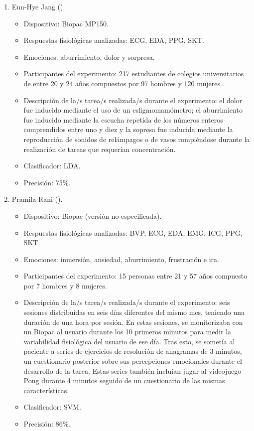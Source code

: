 \begin{enumerate}
    \item Eun-Hye Jang (\citeyear{jang2013classification}).
    \begin{itemize}
        \item Dispositivo: Biopac MP150.
        \item Respuestas fisiológicas analizadas: ECG, EDA, PPG, SKT.
        \item Emociones: aburrimiento, dolor y sorpresa.
        \item Participantes del experimento: 217 estudiantes de colegios universitarios de entre 20 y 24 años compuestos por 97 hombres y 120 mujeres.
        \item Descripción de la/s tarea/s realizada/s durante el experimento: el dolor fue inducido mediante el uso de un esfigmomamómetro; el aburrimiento fue inducido mediante la escucha repetida de los números enteros comprendidos entre uno y diez y la sopresa fue inducida mediante la reproducción de sonidos de relámpagos o de vasos rompiéndose durante la realización de tareas que requerían concentración.
        \item Clasificador: \ac{LDA}.
        \item Precisión: 75\%.
    \end{itemize}

    \item Pramila Rani (\citeyear{rani2006empirical}).
    \begin{itemize}
        \item Dispositivo: Biopac (versión no especificada).
        \item Respuestas fisiológicas analizadas: BVP, ECG, EDA, EMG, ICG, PPG, SKT.
        \item Emociones: inmersión, ansiedad, aburrimiento, frustración e ira.
        \item Participantes del experimento: 15 personas entre 21 y 57 años compuesto por 7 hombres y 8 mujeres.
        \item Descripción de la/s tarea/s realizada/s durante el experimento: seis sesiones distribuidas en seis días diferentes del mismo mes, teniendo una duración de una hora por sesión. En estas sesiones, se monitorizaba con un Biopac al usuario durante los 10 primeros minutos para medir la variabilidad fisiológica del usuario de ese día. Tras esto, se sometía al paciente a series de ejercicios de resolución de anagramas de 3 minutos, un cuestionario posterior sobre sus percepciones emocionales durante el desarrollo de la tarea. Estas series también incluían jugar al videojuego Pong durante 4 minutos seguido de un cuestionario de las mismas características.
        \item Clasificador: SVM.
        \item Precisión: 86\%.
    \end{itemize}


\end{enumerate}
